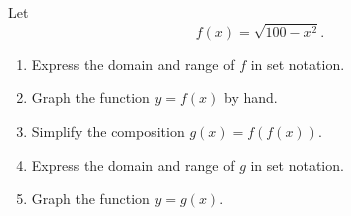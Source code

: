 \documentclass{ximera}
\begin{document}
\begin{question} \label{Qgcgrt45r5r5}
Let
\[
   f(x) = \sqrt{100-x^2}.
\]

\begin{enumerate}
\item Express the domain and range of $f$ in set notation.

\item Graph the function $y=f(x)$ by hand.

\item Simplify the composition $g(x) = f(f(x))$.

\item Express the domain and range of $g$ in set notation.

\item Graph the function $y=g(x)$.

\end{enumerate}
\end{question}
\end{document}
